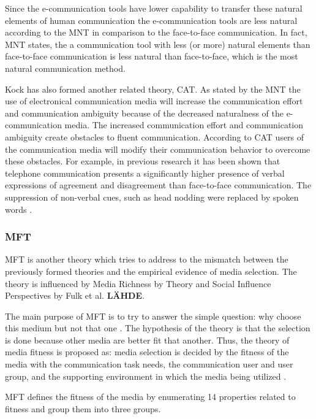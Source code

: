 \documentclass[english,12pt,a4paper,pdftex]{article}
\begin{document}
Since the e-communication tools have lower capability to transfer these natural elements of human communication the e-communication tools are less natural according to the \ac{MNT} in comparison to the face-to-face communication. In fact, \ac{MNT} states, the a communication tool with less (or more) natural elements than face-to-face communication is less natural than face-to-face, which is the most natural communication method. \citep{kock2005} \citep{kock2004}

Kock has also formed another related theory, \ac{CAT}. As stated by the \ac{MNT} the use of electronical communication media will increase the communication effort and communication ambiguity because of the decreased naturalness of the e-communication media. The increased communication effort and communication ambiguity create obstacles to fluent communication. According to \ac{CAT} users of the communication media will modify their communication behavior to overcome these obstacles. For example, in previous research it has been shown that telephone communication presents a significantly higher presence of verbal expressions of agreement and disagreement than face-to-face communication. The suppression of non-verbal cues, such as head nodding were replaced by spoken words \citep{kock2007}.

\subsubsection{\Acl{MFT}}

\ac{MFT} is another theory which tries to address to the mismatch between the previously formed theories and the empirical evidence of media selection. The theory is influenced by Media Richness by \citet{daft1986} Theory and Social Influence Perspectives by Fulk et al. \textbf{LÄHDE}.

The main purpose of \ac{MFT} is to try to answer the simple question: why choose this medium but not that one \citep{higa2007}. The hypothesis of the theory is that the selection is done because other media are better fit that another. Thus, the theory of media fitness is proposed as: media selection is decided by the fitness of the media with the communication task needs, the communication user and user group, and the supporting environment in which the media being utilized \citep{higa2007}.

\ac{MFT} defines the fitness of the media by enumerating 14 properties related to fitness and group them into three groups. 
\end{document}

